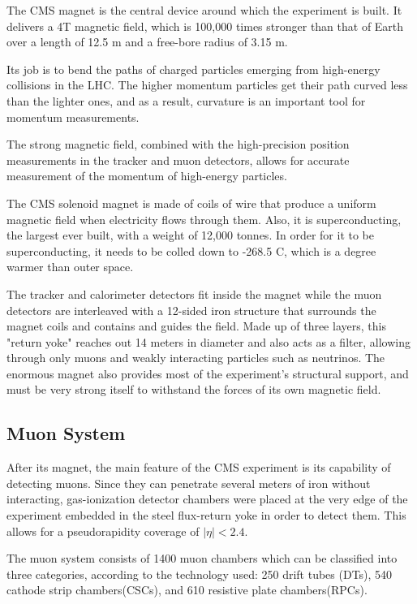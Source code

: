  The CMS magnet\cite{Acquistapace:1997fm} is the central device around which the experiment is built. It delivers a 4T magnetic field, which is 100,000 times stronger than that of Earth over a length of 12.5 m and a free-bore radius of 3.15 m.

 Its job is to bend the paths of charged particles emerging from high-energy collisions in the LHC. The higher momentum particles get their path curved less than the lighter ones, and as a result, curvature is an important tool for momentum measurements. 

 The strong magnetic field, combined with the high-precision position measurements in the tracker and muon detectors, allows for accurate measurement of the momentum of high-energy particles.

 The CMS solenoid magnet is made of coils of wire that produce a uniform magnetic field when electricity flows through them. Also, it is superconducting, the largest ever built, with a weight of 12,000 tonnes. In order for it to be superconducting, it needs to be colled down to -268.5 C, which is a degree warmer than outer space.

 The tracker and calorimeter detectors fit inside the magnet while the muon detectors are interleaved with a 12-sided iron structure that surrounds the magnet coils and contains and guides the field. Made up of three layers, this "return yoke" reaches out 14 meters in diameter and also acts as a filter, allowing through only muons and weakly interacting particles such as neutrinos. The enormous magnet also provides most of the experiment's structural support, and must be very strong itself to withstand the forces of its own magnetic field.


 \subsection{Muon System}
 After its magnet, the main feature of the CMS experiment is its capability of detecting muons. Since they can penetrate several meters of iron without interacting, gas-ionization detector chambers were placed at the very edge of the experiment embedded in the steel flux-return yoke in order to detect them. This allows for a pseudorapidity coverage of $|\eta| < 2.4$.

 The muon system consists of 1400 muon chambers which can be classified into three categories, according to the technology used: 250 drift tubes (DTs), 540 cathode strip chambers(CSCs), and 610 resistive plate chambers(RPCs).

